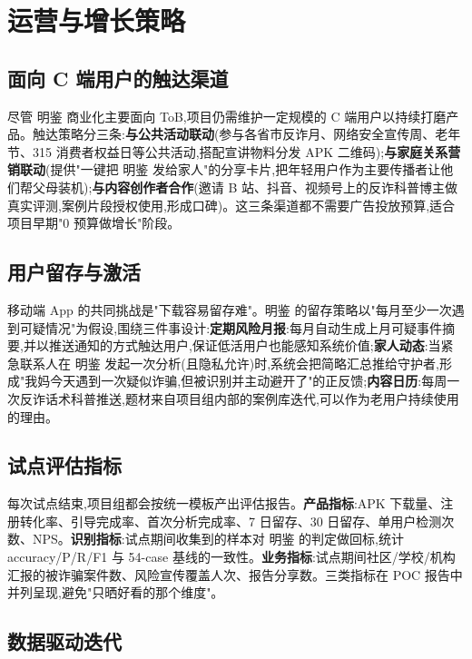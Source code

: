 \documentclass[UTF8,a4paper,12pt]{ctexart}
\begin{document}
\section{运营与增长策略}

\subsection{面向 C 端用户的触达渠道}

尽管 明鉴 商业化主要面向 ToB,项目仍需维护一定规模的 C 端用户以持续打磨产品。触达策略分三条:\textbf{与公共活动联动}(参与各省市反诈月、网络安全宣传周、老年节、315 消费者权益日等公共活动,搭配宣讲物料分发 APK 二维码);\textbf{与家庭关系营销联动}(提供"一键把 明鉴 发给家人"的分享卡片,把年轻用户作为主要传播者让他们帮父母装机);\textbf{与内容创作者合作}(邀请 B 站、抖音、视频号上的反诈科普博主做真实评测,案例片段授权使用,形成口碑)。这三条渠道都不需要广告投放预算,适合项目早期"0 预算做增长"阶段。

\subsection{用户留存与激活}

移动端 App 的共同挑战是"下载容易留存难"。明鉴 的留存策略以"每月至少一次遇到可疑情况"为假设,围绕三件事设计:\textbf{定期风险月报}:每月自动生成上月可疑事件摘要,并以推送通知的方式触达用户,保证低活用户也能感知系统价值;\textbf{家人动态}:当紧急联系人在 明鉴 发起一次分析(且隐私允许)时,系统会把简略汇总推给守护者,形成"我妈今天遇到一次疑似诈骗,但被识别并主动避开了"的正反馈;\textbf{内容日历}:每周一次反诈话术科普推送,题材来自项目组内部的案例库迭代,可以作为老用户持续使用的理由。

\subsection{试点评估指标}

每次试点结束,项目组都会按统一模板产出评估报告。\textbf{产品指标}:APK 下载量、注册转化率、引导完成率、首次分析完成率、7 日留存、30 日留存、单用户检测次数、NPS。\textbf{识别指标}:试点期间收集到的样本对 明鉴 的判定做回标,统计 accuracy/P/R/F1 与 54-case 基线的一致性。\textbf{业务指标}:试点期间社区/学校/机构汇报的被诈骗案件数、风险宣传覆盖人次、报告分享数。三类指标在 POC 报告中并列呈现,避免"只晒好看的那个维度"。

\subsection{数据驱动迭代}
\end{document}
